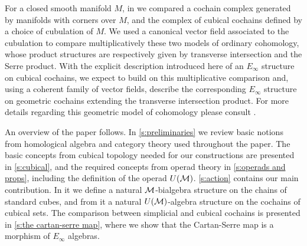 For a closed smooth manifold $M$, in \cite{medina2021flowing} we compared a cochain complex generated by manifolds with corners over $M$, and the complex of cubical cochains defined by a choice of cubulation of $M$.
We used a canonical vector field associated to the cubulation to compare multiplicatively these two models of ordinary cohomology, whose product structures are respectively given by transverse intersection and the Serre product.
With the explicit description introduced here of an $E_\infty$ structure on cubical cochains, we expect to build on this multiplicative comparison and, using a coherent family of vector fields, describe the corresponding $E_\infty$ structure on geometric cochains extending the transverse intersection product.
For more details regarding this geometric model of cohomology please consult \cite{medina2021foundations}.

An overview of the paper follows.
In \cref{s:preliminaries} we review basic notions from homological algebra and category theory used throughout the paper.
The basic concepts from cubical topology needed for our constructions are presented in \cref{s:cubical}, and the required concepts from operad theory in \cref{s:operads and props}, including the definition of the operad $U(\mathcal{M})$.
\cref{s:action} contains our main contribution.
In it we define a natural $\mathcal{M}$-bialgebra structure on the chains of standard cubes, and from it a natural $U(\mathcal{M})$-algebra structure on the cochains of cubical sets.
The comparison between simplicial and cubical cochains is presented in \cref{s:the cartan-serre map}, where we show that the Cartan-Serre map is a morphism of $E_\infty$ algebras.